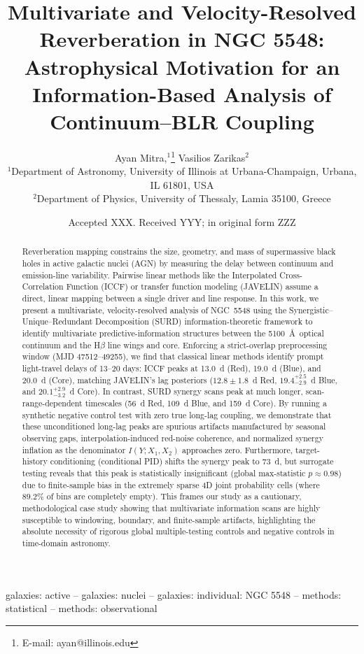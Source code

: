 \documentclass[fleqn,usenatbib]{mnras}
\title[SURD in NGC 5548]{Multivariate and Velocity-Resolved Reverberation in NGC 5548: Astrophysical Motivation for an Information-Based Analysis of Continuum--BLR Coupling}
\author[A. Mitra \& V. Zarikas]{
Ayan Mitra,$^{1}$\thanks{E-mail: ayan@illinois.edu}
Vasilios Zarikas$^{2}$
\\
$^{1}$Department of Astronomy, University of Illinois at Urbana-Champaign, Urbana, IL 61801, USA\\
$^{2}$Department of Physics, University of Thessaly, Lamia 35100, Greece
}
\date{Accepted XXX. Received YYY; in original form ZZZ}
\begin{document}
\label{firstpage}
\pagerange{\pageref{firstpage}--\pageref{lastpage}}
\maketitle

\begin{abstract}
Reverberation mapping constrains the size, geometry, and mass of supermassive black holes in active galactic nuclei (AGN) by measuring the delay between continuum and emission-line variability. Pairwise linear methods like the Interpolated Cross-Correlation Function (ICCF) or transfer function modeling (JAVELIN) assume a direct, linear mapping between a single driver and line response. In this work, we present a multivariate, velocity-resolved analysis of NGC~5548 using the Synergistic--Unique--Redundant Decomposition (SURD) information-theoretic framework to identify multivariate predictive-information structures between the 5100~\AA\ optical continuum and the H\(\beta\) line wings and core. Enforcing a strict-overlap preprocessing window (MJD 47512--49255), we find that classical linear methods identify prompt light-travel delays of 13--20 days: ICCF peaks at 13.0~d (Red), 19.0~d (Blue), and 20.0~d (Core), matching JAVELIN's lag posteriors ($12.8 \pm 1.8$~d Red, $19.4_{-2.9}^{+2.5}$~d Blue, and $20.1_{-3.2}^{+2.9}$~d Core). In contrast, SURD synergy scans peak at much longer, scan-range-dependent timescales (56~d Red, 109~d Blue, and 159~d Core). By running a synthetic negative control test with zero true long-lag coupling, we demonstrate that these unconditioned long-lag peaks are spurious artifacts manufactured by seasonal observing gaps, interpolation-induced red-noise coherence, and normalized synergy inflation as the denominator $I(Y; X_1, X_2)$ approaches zero. Furthermore, target-history conditioning (conditional PID) shifts the synergy peak to 73~d, but surrogate testing reveals that this peak is statistically insignificant (global max-statistic $p \approx 0.98$) due to finite-sample bias in the extremely sparse 4D joint probability cells (where $89.2\%$ of bins are completely empty). This frames our study as a cautionary, methodological case study showing that multivariate information scans are highly susceptible to windowing, boundary, and finite-sample artifacts, highlighting the absolute necessity of rigorous global multiple-testing controls and negative controls in time-domain astronomy.
\end{abstract}
\begin{keywords}
galaxies: active -- galaxies: nuclei -- galaxies: individual: NGC 5548 -- methods: statistical -- methods: observational
\end{keywords}
\end{document}
